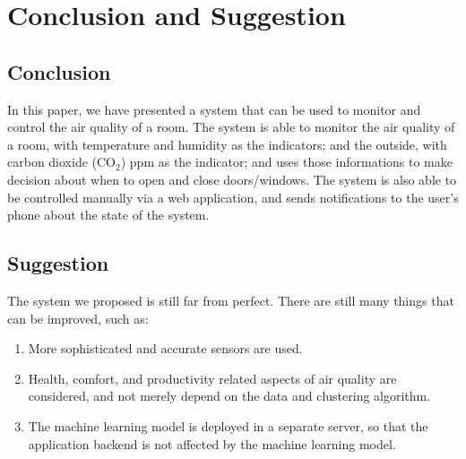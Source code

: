 \section{Conclusion and Suggestion}

\subsection{Conclusion}
In this paper, we have presented a system that can be
used to monitor and control the air quality of a room.
The system is able to monitor the air quality of a room,
with temperature and humidity as the indicators; and
the outside, with carbon dioxide (CO$_2$) ppm as the indicator;
and uses those informations to make decision about when to
open and close doors/windows.
The system is also able to be controlled manually via a web
application, and sends notifications to the user's phone
about the state of the system.

\subsection{Suggestion}
The system we proposed is still far from perfect.
There are still many things that can be improved, such as:
\begin{enumerate}
      \item More sophisticated and accurate sensors are
            used.
      \item Health, comfort, and productivity related
            aspects of air quality are considered,
            and not merely depend on the data and
            clustering algorithm.
      \item The machine learning model is deployed
            in a separate server, so that the
            application backend is not affected
            by the machine learning model.
\end{enumerate}
